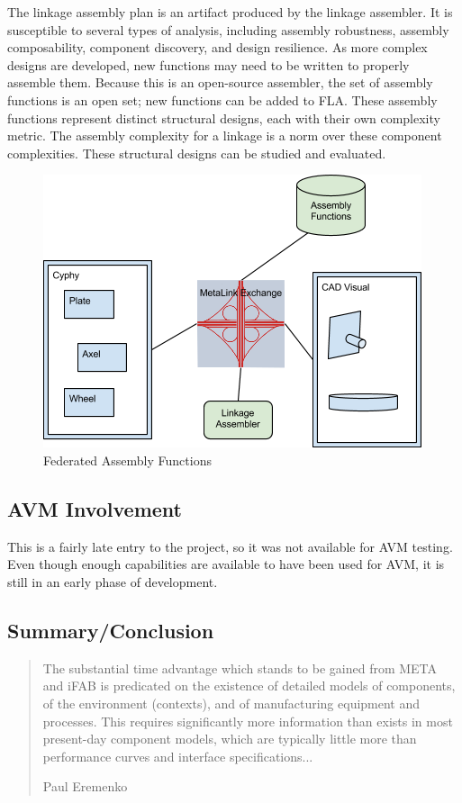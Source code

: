 \documentclass[]{report}
\begin{document}
The linkage assembly plan is an artifact produced by the linkage assembler. 
It is susceptible to several types of analysis, including assembly robustness, 
assembly composability, component discovery, and design resilience. 
As more complex designs are developed, new functions may need to be written to properly assemble them. 
Because this is an open-source assembler, the set of assembly functions is an open set; 
new functions can be added to FLA. 
These assembly functions represent distinct structural designs, 
each with their own complexity metric. 
The assembly complexity for a linkage is a norm over these component complexities. 
These structural designs can be studied and evaluated.

\begin{figure}[h!]
	\centering
	\includegraphics[scale=0.7]{images/image17.png}
	\caption{Federated Assembly Functions}
	\label{fig:federated-metalink}
\end{figure}

\subsection{AVM Involvement}

This is a fairly late entry to the project, so it was not available for AVM testing.  
Even though enough capabilities are available to have been used for AVM, it is still in an early phase of development.

\subsection{Summary/Conclusion} 

\blockquote[Paul Eremenko]{
The substantial time advantage which stands to be gained from META and iFAB is 
predicated on the existence of detailed models of components, of the environment (contexts),
and of manufacturing equipment and processes. 
This requires significantly more information than exists in most present-day component models, 
which are typically little more than performance curves and interface specifications...}.
 
\end{document}
